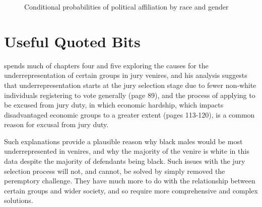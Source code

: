 \begin{figure}[h!]
  \caption[Political Affiliation by Race and Gender (Sunshine)]
  {Conditional probabilities of political affiliation by race and gender} 
  \label{fig:racepolitics}
\end{figure}

\section{Useful Quoted Bits}

\cite{vandykejurysel} spends much of chapters four and five exploring the causes for the underrepresentation of certain groups in
jury venires, and his analysis suggests that underrepresentation starts at the jury selection stage due to fewer non-white
individuals registering to vote generally (page 89), and the process of applying to be excused from jury duty, in which economic
hardship, which impacts disadvantaged economic groups to a greater extent (pages 113-120), is a common reason for excusal from
jury duty.

Such explanations provide a plausible reason why black males would be most underrepresented in venires, and why the majority of
the venire is white in this data despite the majority of defendants being black. Such issues with the jury selection process will
not, and cannot, be solved by simply removed the peremptory challenge. They have much more to do with the relationship between
certain groups and wider society, and so require more comprehensive and complex solutions.